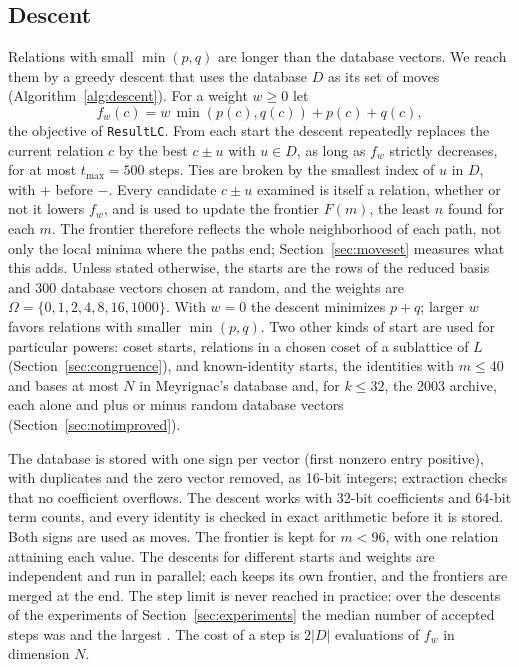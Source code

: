 \documentclass[11pt]{amsart}
\theoremstyle{definition}
\theoremstyle{remark}
\begin{document}
\subsection{Descent}\label{sec:descent}
Relations with small $\min(p,q)$ are longer than the database vectors. We reach them by a
greedy descent that uses the database $D$ as its set of moves (Algorithm~\ref{alg:descent}).
For a weight $w\ge0$ let
\[
f_w(c)=w\,\min(p(c),q(c))+p(c)+q(c),
\]
the objective of \texttt{ResultLC}. From each start the descent repeatedly replaces the current
relation $c$ by the best $c\pm u$ with $u\in D$, as long as $f_w$ strictly decreases, for at
most $t_{\max}=500$ steps. Ties are broken by the smallest index of $u$ in $D$, with $+$
before $-$. Every candidate $c\pm u$ examined is itself a relation, whether or not it lowers
$f_w$, and is used to update the frontier $F(m)$, the least $n$ found for each $m$. The
frontier therefore reflects the whole neighborhood of each path, not only the local minima where
the paths end; Section~\ref{sec:moveset} measures what this adds. Unless stated otherwise, the
starts are the rows of the reduced basis and 300 database vectors chosen at random, and the
weights are $\Omega=\{0,1,2,4,8,16,1000\}$. With $w=0$ the descent minimizes $p+q$; larger $w$
favors relations with smaller $\min(p,q)$. Two other kinds of start are used for particular
powers: coset starts, relations in a chosen coset of a sublattice of $L$
(Section~\ref{sec:congruence}), and known-identity starts, the identities with $m\le40$ and bases
at most $N$ in Meyrignac's database and, for $k\le32$, the 2003 archive, each alone and plus or minus random
database vectors (Section~\ref{sec:notimproved}).

The database is stored with one sign per vector (first nonzero entry positive), with
duplicates and the zero vector removed, as 16-bit integers; extraction checks that no
coefficient overflows. The descent works with 32-bit coefficients and 64-bit term counts, and
every identity is checked in exact arithmetic before it is stored. Both signs are used as
moves. The frontier is kept for $m<96$, with one
relation attaining each value. The descents for different starts and weights are independent
and run in parallel; each keeps its own frontier, and the frontiers are merged at the end. The
step limit is never reached in practice: over the \StepsTasks{} descents of the experiments of
Section~\ref{sec:experiments} the median number of accepted steps was \StepsMedian{} and the largest
\StepsMax{}. The cost of a step is $2|D|$ evaluations of $f_w$ in dimension $N$.
\end{document}
